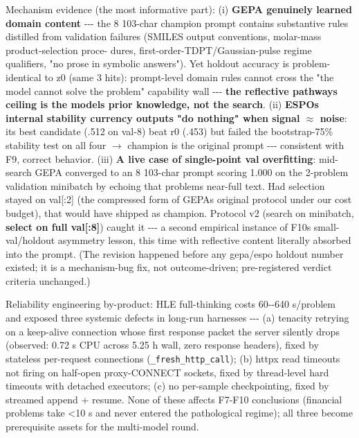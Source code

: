 Mechanism evidence (the most informative part): (i) \textbf{GEPA genuinely learned domain content} -\/-\/- the 8 103-char champion prompt contains substantive rules distilled from validation failures (SMILES output conventions, molar-mass product-selection proce- dures, first-order-TDPT/Gaussian-pulse regime qualifiers, "no prose in symbolic answers"). Yet holdout accuracy is problem-identical to z0 (same 3 hits): prompt-level domain rules cannot cross the "the model cannot solve the problem" capability wall -\/-\/- \textbf{the reflective pathway\textquotesingle s ceiling is the model\textquotesingle s prior knowledge, not the search}. (ii) \textbf{ESPO\textquotesingle s internal stability currency outputs "do nothing" when signal \(\approx\) noise}: its best candidate (.512 on val-8) beat r0 (.453) but failed the bootstrap-75\% stability test on all four \(\rightarrow\) champion is the original prompt -\/-\/- consistent with F9, correct behavior. (iii) \textbf{A live case of single-point val overfitting}: mid-search GEPA converged to an 8 103-char prompt scoring 1.000 on the 2-problem validation minibatch by echoing that problem\textquotesingle s near-full text. Had selection stayed on val{[}:2{]} (the compressed form of GEPA\textquotesingle s original protocol under our cost budget), that would have shipped as champion. Protocol v2 (search on minibatch, \textbf{select on full val{[}:8{]}}) caught it -\/-\/- a second empirical instance of F10\textquotesingle s small-val/holdout asymmetry lesson, this time with reflective content literally absorbed into the prompt. (The revision happened before any gepa/espo holdout number existed; it is a mechanism-bug fix, not outcome-driven; pre-registered verdict criteria unchanged.)

Reliability engineering by-product: HLE full-thinking costs 60-\/-640 s/problem and exposed three systemic defects in long-run harnesses -\/-\/- (a) tenacity retrying on a keep-alive connection whose first response packet the server silently drops (observed: 0.72 s CPU across 5.25 h wall, zero response headers), fixed by stateless per-request connections (\texttt{\_fresh\_http\_call}); (b) httpx read timeouts not firing on half-open proxy-CONNECT sockets, fixed by thread-level hard timeouts with detached executors; (c) no per-sample checkpointing, fixed by streamed append + resume. None of these affects F7-F10 conclusions (financial problems take \textless10 s and never entered the pathological regime); all three become prerequisite assets for the multi-model round.

